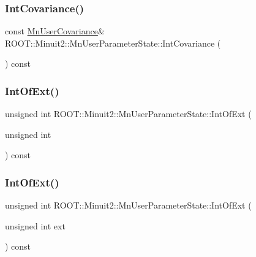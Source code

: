 \subsubsection{\texorpdfstring{IntCovariance()}{IntCovariance()}\hspace{0.1cm}{\footnotesize\ttfamily [3/3]}}
{\footnotesize\ttfamily const \mbox{\hyperlink{classROOT_1_1Minuit2_1_1MnUserCovariance}{Mn\+User\+Covariance}}\& R\+O\+O\+T\+::\+Minuit2\+::\+Mn\+User\+Parameter\+State\+::\+Int\+Covariance (\begin{DoxyParamCaption}{ }\end{DoxyParamCaption}) const\hspace{0.3cm}{\ttfamily [inline]}}

\mbox{\label{classROOT_1_1Minuit2_1_1MnUserParameterState_ab07f3ff917c70471b327243764aaad83}} 
\subsubsection{\texorpdfstring{IntOfExt()}{IntOfExt()}\hspace{0.1cm}{\footnotesize\ttfamily [1/3]}}
{\footnotesize\ttfamily unsigned int R\+O\+O\+T\+::\+Minuit2\+::\+Mn\+User\+Parameter\+State\+::\+Int\+Of\+Ext (\begin{DoxyParamCaption}\item[{unsigned int}]{ }\end{DoxyParamCaption}) const}

\mbox{\label{classROOT_1_1Minuit2_1_1MnUserParameterState_ab07f3ff917c70471b327243764aaad83}} 
\subsubsection{\texorpdfstring{IntOfExt()}{IntOfExt()}\hspace{0.1cm}{\footnotesize\ttfamily [2/3]}}
{\footnotesize\ttfamily unsigned int R\+O\+O\+T\+::\+Minuit2\+::\+Mn\+User\+Parameter\+State\+::\+Int\+Of\+Ext (\begin{DoxyParamCaption}\item[{unsigned int}]{ext }\end{DoxyParamCaption}) const}

